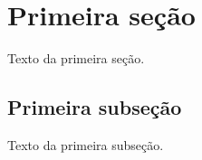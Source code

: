 \documentclass[a4paper,12pt,oneside,onecolumn,final,fleqn]{repUERJ}
\begin{document}





\appendix %






\annex %


\section{Primeira seção}

Texto da primeira seção.

\subsection{Primeira subseção}

Texto da primeira subseção.
\end{document}
